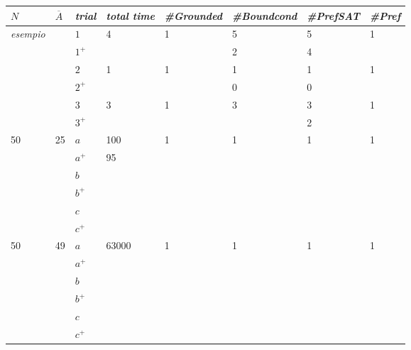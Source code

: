 \begin{table}
    \begin{tabular}{lll|lllll}
    $N$&$\overline{A}$ & \emph{trial} & \emph{total time} & \emph{\#Grounded} & \emph{\#Boundcond} & \emph{\#PrefSAT} & \emph{\#Pref} \\ \hline \hline
    
    \emph{esempio} & ~ & $1$ 	& 4          & 1          & 5           & 5         & 1      \\
    ~   & ~            & $1^+$	& ~          & ~          & 2           & 4         & ~      \\ \cline{3-8}
    ~   & ~            & $2$ 	& 1          & 1          & 1           & 1         & 1      \\
    ~   & ~            & $2^+$	& ~          & ~          & 0           & 0         & ~      \\ \cline{3-8}
    ~   & ~            & $3$ 	& 3          & 1          & 3           & 3         & 1      \\
    ~   & ~            & $3^+$	& ~          & ~          & ~           & 2         & ~      \\ \hline \hline
    
    50 & 25		       & $a$   		& 100      & 1          & 1           & 1         & 1 \\
    ~   & ~            & $a^+$		& 95         & ~          & ~           & ~ 		& ~ \\ \cline{3-8}
    ~   & ~            & $b$    	& ~          & ~          & ~           & ~         & ~ \\
    ~   & ~            & $b^+$		& ~          & ~          & ~           & ~ 		& ~ \\ \cline{3-8}
    ~   & ~            & $c$   		& ~          & ~          & ~           & ~         & ~ \\
    ~   & ~            & $c^+$		& ~          & ~          & ~           & ~ 		& ~ \\ \hline \hline
    
    50  & 49          & $a$   		& 63000      & 1          & 1           & 1         & 1 \\
    ~   & ~            & $a^+$		& ~          & ~          & ~           & ~ 		& ~ \\ \cline{3-8}
    ~   & ~            & $b$    	& ~          & ~          & ~           & ~         & ~ \\
    ~   & ~            & $b^+$		& ~          & ~          & ~           & ~ 		& ~ \\ \cline{3-8}
    ~   & ~            & $c$   		& ~          & ~          & ~           & ~         & ~ \\
    ~   & ~            & $c^+$		& ~          & ~          & ~           & ~ 		& ~ \\ \hline \hline
    

\end{tabular}
\end{table}
